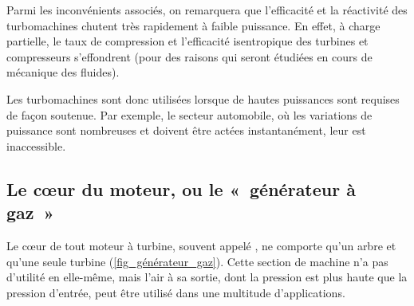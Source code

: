 {{		Parmi les inconvénients associés, on remarquera que l’efficacité et la réactivité des turbomachines chutent très rapidement à faible puissance. En effet, à charge partielle, le taux de compression et l’efficacité isentropique des turbines et compresseurs s’effondrent (pour des raisons qui seront étudiées en cours de mécanique des fluides). 

		Les turbomachines sont donc utilisées lorsque de hautes puissances sont requises de façon soutenue. Par exemple, le secteur automobile, où les variations de puissance sont nombreuses et doivent être actées instantanément, leur est inaccessible.



	\subsection{Le cœur du moteur, ou le «~générateur à gaz~»}

		Le cœur de tout moteur à turbine, souvent appelé , ne comporte qu’un arbre et qu’une seule turbine (\cref{fig_générateur_gaz}). Cette section de machine n’a pas d’utilité en elle-même, mais l’air à sa sortie, dont la pression est plus haute que la pression d’entrée, peut être utilisé dans une multitude d’applications.

}}
